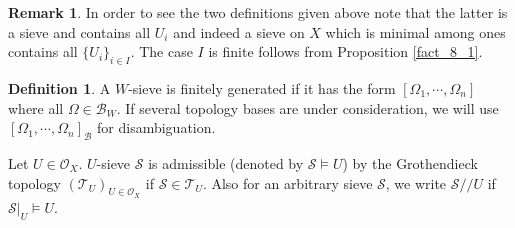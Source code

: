 \documentclass[10pt]{article}
\numberwithin{equation}{section}
\theoremstyle{definition}
\newtheorem{definition}{Definition}[subsection]
\newtheorem{remark}{Remark}[subsection]
\newcommand{\Ouv}{\mathscr{O}}
\newcommand{\sS}[0]{\mathscr{S}}
\begin{document}
\begin{remark}
    In order to see the two definitions given above note that the latter is a sieve and contains all $U_i$ and indeed a sieve on $X$ which is minimal among ones contains all $\{U_i\}_{i\in I}$. The case $I$ is finite follows from Proposition \ref{fact_8_1}.
\end{remark}
\begin{definition}
    A $W$-sieve is finitely generated if it has the form $[\Omega_1,\cdots,\Omega_n]$ where all $\Omega\in\mathcal{B}_W$. If several topology bases are under consideration, we will use $[\Omega_1,\cdots,\Omega_n]_\mathcal{B}$ for disambiguation.
    \par Let $U\in\Ouv_X$. $U$-sieve $\sS$ is admissible (denoted by $\sS\vDash U$) by the Grothendieck topology $(\mathcal{T}_U)_{U\in\Ouv_X}$ if $\sS\in\mathcal{T}_U$. Also for an arbitrary sieve $\sS$, we write $\sS//U$ if $\sS|_U\vDash U$.
\end{definition}
\end{document}
